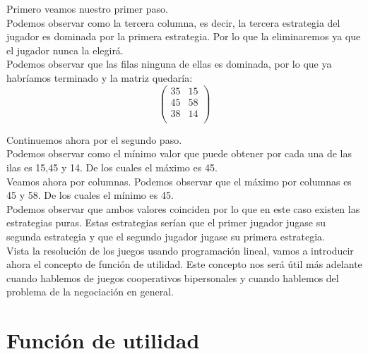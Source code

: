 \documentclass[10pt,a4paper]{book}
\begin{document}
Primero veamos nuestro primer paso.\\
Podemos observar como la tercera columna, es decir, la tercera estrategia del jugador es dominada por la primera estrategia. Por lo que la eliminaremos ya que el jugador nunca la elegirá. \\

Podemos observar que las filas ninguna de ellas es dominada, por lo que ya habríamos terminado y la matriz quedaría:\\

$$
\left(
\begin{array}{cccc}
35 & 15  \\
45 & 58  \\
38 & 14 \\
\end{array}
\right)
$$

Continuemos ahora por el segundo paso.\\

Podemos observar como el mínimo valor que puede obtener por cada una de las ilas es 15,45 y 14. De los cuales el máximo es 45. \\

Veamos ahora por columnas. Podemos observar que el máximo por columnas es 45 y 58. De los cuales el mínimo es 45.\\

Podemos observar que ambos valores coinciden por lo que en este caso existen las estrategias puras. Estas estrategias serían que el primer jugador jugase su segunda estrategia y que el segundo jugador jugase su primera estrategia.\\



Vista la resolución de los juegos usando programación lineal, vamos a introducir ahora el concepto de función de utilidad. Este concepto nos será útil más adelante cuando hablemos de juegos cooperativos bipersonales y cuando hablemos del problema de la negociación en general.\\


\chapter{Función de utilidad}		
	
\end{document}
